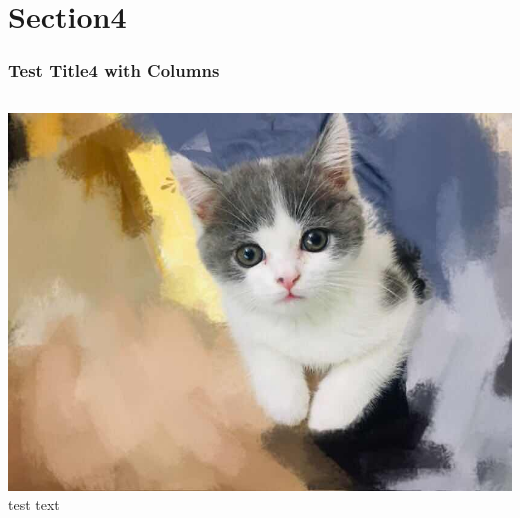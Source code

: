 \documentclass{beamer}
\begin{document}
\section{Section4}

\begin{frame}
    \frametitle{Test Title4 with Columns}
    \begin{columns}
        \includegraphics[width=.85\textwidth]{Yugor.jpg}
        test text
    \end{columns}

\end{frame}
\end{document}
